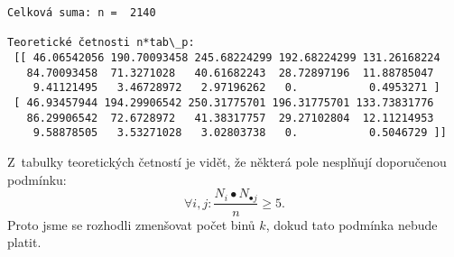 \documentclass[11pt]{article}
\begin{document}
    \begin{Verbatim}[commandchars=\\\{\}]
Celková suma: n =  2140

Teoretické četnosti n*tab\_p:
 [[ 46.06542056 190.70093458 245.68224299 192.68224299 131.26168224
   84.70093458  71.3271028   40.61682243  28.72897196  11.88785047
    9.41121495   3.46728972   2.97196262   0.           0.4953271 ]
 [ 46.93457944 194.29906542 250.31775701 196.31775701 133.73831776
   86.29906542  72.6728972   41.38317757  29.27102804  12.11214953
    9.58878505   3.53271028   3.02803738   0.           0.5046729 ]]

    \end{Verbatim}

\noindent
Z~tabulky teoretických četností je vidět, že některá pole nesplňují
doporučenou
podmínku:\[\forall{i,j}: \dfrac{N_i\bullet N_{\bullet j}}{n} \geq 5.\]
Proto jsme se rozhodli zmenšovat počet binů \(k\), dokud tato podmínka
nebude platit.
\end{document}
